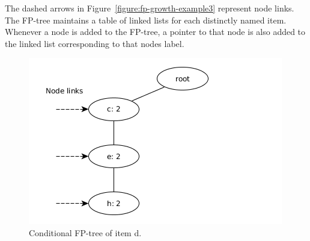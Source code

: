 The dashed arrows in Figure~\ref{figure:fp-growth-example3} represent node links. The FP-tree maintains a table of linked lists for each distinctly named item. Whenever a node is added to the FP-tree, a pointer to that node is also added to the linked list corresponding to that nodes label.

\begin{figure} %
	\centering
	\includegraphics[scale=0.5]{fp-tree-example/fp-tree-conditional.png}
	\caption{Conditional FP-tree of item d.}
	\label{figure:fp-tree-conditional}
\end{figure}


